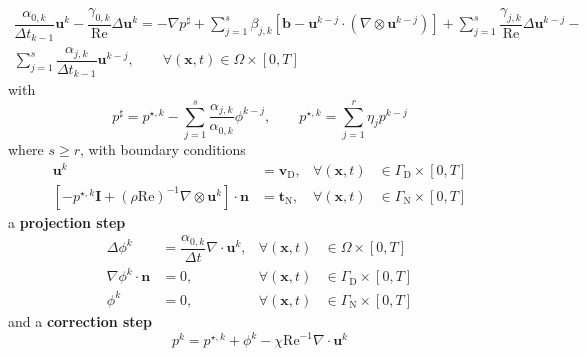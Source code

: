 \documentclass[]{scrartcl}
\begin{document}
\begin{equation*}
\begin{split}
	\dfrac{\alpha_{0,k}}{\Delta t_{k-1}} \mathbf{u}^{k} -\dfrac{\gamma_{0,k}}{\textrm{Re}} \Delta \mathbf{u}^{k} = -\nabla p^{\sharp} + \sum_{j=1}^{s} \beta_{j,k} \left[ \mathbf{b} - \mathbf{u}^{k-j} \cdot (\nabla \otimes \mathbf{u}^{k-j})\right] +
	\sum_{j=1}^{s} \dfrac{\gamma_{j,k}}{\textrm{Re}} \Delta \mathbf{u}^{k-j} -  \\ \sum_{j=1}^{s} \dfrac{\alpha_{j,k}}{\Delta t_{k-1}}\mathbf{u}^{k-j}, \qquad \forall(\mathbf{x},t)\in \Omega \times [0, T]
\end{split}
\end{equation*}
with
\begin{equation*}
	 p^\sharp = p^{\star, k} - \sum_{j=1}^{s} \dfrac{\alpha_{j,k}}{\alpha_{0,k}} \phi^{k-j},
	 \qquad
	 p^{\star, k} = \sum_{j=1}^{r} \eta_j p^{k-j}
\end{equation*}
where $s\ge r$, with boundary conditions
\begin{equation*}
	\begin{aligned}
		\mathbf{u}^{k} &= \mathbf{v}_\textrm{D}, &\forall(\mathbf{x}, t) &\in \Gamma_\textrm{D} \times [0, T] \\
		[- p^{\star, k} \mathbf{I} + (\rho\textrm{Re})^{-1} \nabla \otimes \mathbf{u}^{k}] \cdot \mathbf{n} &= \mathbf{t}_\textrm{N},  &\forall(\mathbf{x}, t) &\in \Gamma_\textrm{N} \times [0, T]
	\end{aligned}
\end{equation*}
a \textbf{projection step}
\begin{equation*}
\begin{aligned}
\Delta \phi^{k} &= \dfrac{\alpha_{0,k}}{\Delta t} \nabla \cdot \mathbf{u}^{k},  &\forall (\mathbf{x}, t) &\in \Omega \times \left[0, T \right] \\
\nabla \phi^{k} \cdot \mathbf{n} &= 0, &\forall (\mathbf{x}, t) &\in \Gamma_\textrm{D} \times \left[0, T \right] \\
\phi^{k} &= 0, &\forall\left(\mathbf{x}, t\right) &\in \Gamma_\textrm{N} \times \left[0, T \right]
\end{aligned}
\end{equation*}
and a \textbf{correction step}
\begin{equation*}
	p^{k} = p^{\star, k} + \phi^{k} - \chi\textrm{Re}^{-1} \nabla \cdot \mathbf{u}^{k}
\end{equation*}
\end{document}
